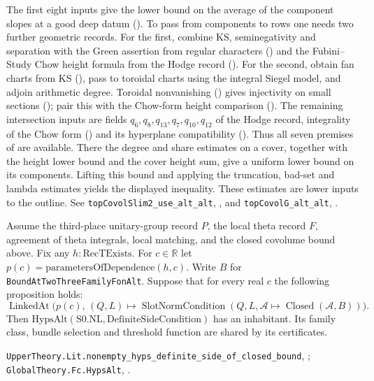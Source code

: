 \begin{outline}
The first eight inputs give the lower bound on the average of the
component slopes at a good deep datum (). To pass from
components to rows one needs two further geometric records.
For the first, combine KS, seminegativity and separation with
the Green assertion from regular characters () and the
Fubini--Study Chow height formula from the Hodge record ().
For the second, obtain fan charts from KS (), pass to
toroidal charts using the integral Siegel model, and adjoin arithmetic
degree. Toroidal nonvanishing () gives injectivity on
small sections (); pair this with the Chow-form height
comparison (). The remaining intersection inputs are
fields $q_6,q_8,q_{13},q_7,q_{10},q_{12}$ of the Hodge record,
integrality of the Chow form () and its hyperplane
compatibility ().
Thus all seven premises of  are available.
There the degree and share estimates on a cover, together with the
height lower bound and the cover height sum, give a uniform lower
bound on its components. Lifting this bound and applying the
truncation, bad-set and lambda estimates yields the displayed
inequality. These estimates are lower inputs to the outline.
See \nolinkurl{topCovolSlim2_use_alt_alt},
, and
\nolinkurl{topCovolG_alt_alt}, .
\end{outline}

\begin{formalstatement}
Assume the third-place unitary-group record $P$, the local theta
record $F$, agreement of theta integrals, local matching, and the
closed covolume bound above. Fix any $h:\mathrm{RecTExists}$.
For $c\in\mathbb R$ let $p(c)=\mathrm{parametersOfDependence}(h,c)$.
Write $B$ for \nolinkurl{BoundAtTwoThreeFamilyFonAlt}. Suppose that
for every real $c$ the following proposition holds:
\[
 \operatorname{LinkedAt}\bigl(p(c),\,
 (Q,L)\mapsto\operatorname{SlotNormCondition}
 (Q,L,\mathcal A\mapsto\operatorname{Closed}(\mathcal A,B))\bigr).
\]
Then $\mathrm{HypsAlt}(\mathrm{S0.NL},\mathrm{DefiniteSideCondition})$
has an inhabitant. Its family class, bundle selection and threshold
function are shared by its certificates.
\end{formalstatement}
\noindent\nolinkurl{UpperTheory.Lit.nonempty_hyps_definite_side_of_closed_bound},
;
\nolinkurl{GlobalTheory.Fc.HypsAlt}, .

